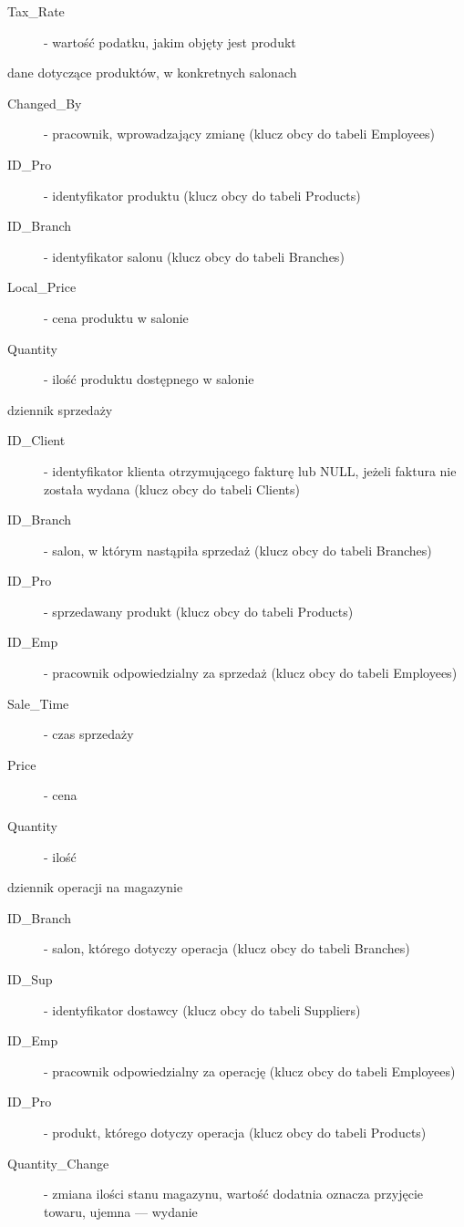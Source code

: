 \begin{description}
\begin{description}
    \item[Tax\_Rate] - wartość podatku, jakim objęty jest produkt
    \end{description}
\item[Branch\_Products] dane dotyczące produktów, w konkretnych salonach
    \begin{description}
    \item[Changed\_By] - pracownik, wprowadzający zmianę (klucz obcy do tabeli Employees)
    \item[ID\_Pro] - identyfikator produktu (klucz obcy do tabeli Products)
    \item[ID\_Branch] - identyfikator salonu (klucz obcy do tabeli Branches)
    \item[Local\_Price] - cena produktu w salonie
    \item[Quantity] - ilość produktu dostępnego w salonie
    \end{description}
\item[Sale\_Log] dziennik sprzedaży
    \begin{description}
    \item[ID\_Client] - identyfikator klienta otrzymującego fakturę lub NULL, jeżeli faktura nie została wydana (klucz obcy do tabeli Clients)
    \item[ID\_Branch] - salon, w którym nastąpiła sprzedaż (klucz obcy do tabeli Branches)
    \item[ID\_Pro] - sprzedawany produkt (klucz obcy do tabeli Products)
    \item[ID\_Emp] - pracownik odpowiedzialny za sprzedaż (klucz obcy do tabeli Employees)
    \item[Sale\_Time] - czas sprzedaży
    \item[Price] - cena
    \item[Quantity] - ilość
    \end{description}
\item[Storage\_Log] dziennik operacji na magazynie
    \begin{description}
    \item[ID\_Branch] - salon, którego dotyczy operacja (klucz obcy do tabeli Branches)
    \item[ID\_Sup] - identyfikator dostawcy (klucz obcy do tabeli Suppliers)
    \item[ID\_Emp] - pracownik odpowiedzialny za operację (klucz obcy do tabeli Employees)
    \item[ID\_Pro] - produkt, którego dotyczy operacja (klucz obcy do tabeli Products)
    \item[Quantity\_Change] - zmiana ilości stanu magazynu, wartość dodatnia oznacza przyjęcie towaru, ujemna --- wydanie

\end{description}
\end{description}
